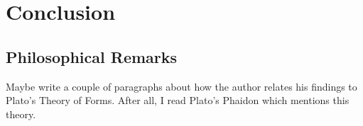 \section{Conclusion}

\subsection{Philosophical Remarks}
Maybe write a couple of paragraphs about how the author relates his findings to Plato's Theory of Forms.
After all, I read Plato's Phaidon which mentions this theory.